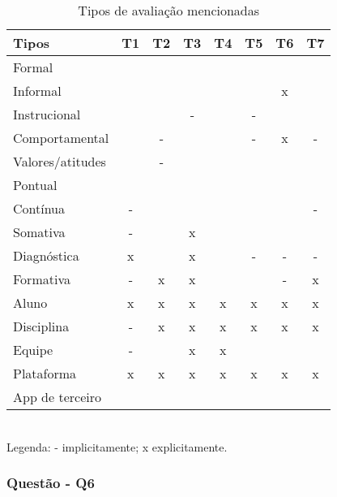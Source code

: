 \begin{table}[ht!]
\footnotesize
\caption{Tipos de avaliação mencionadas}
\label{tab:Q5}
\centering
\begin{tabular}{|l|c|c|c|c|c|c|c|}
\addlinespace \hline
    \bigstrut \textbf{Tipos}&{T1}&{T2}&{T3}&{T4}&{T5}&{T6}&{T7}\\
\hline
    \bigstrut[t]
    Formal	        & 	&   &   &   &   &   &   \\ \hline
    Informal	    &  	&   &   &   &   & x &   \\ \hline	
    Instrucional	& 	&   & - &   & - &   &   \\ \hline
    Comportamental	& 	& - &   &   & - & x & - \\ \hline
    Valores/atitudes& 	& - &   &   &   &   &   \\ \hline    
    Pontual	        & 	&   &   &   &   &   &   \\ \hline
    Contínua        & -	&   &   &   &   &   & - \\ \hline
    Somativa        & - &   & x &   &   &   &   \\ \hline    
    Diagnóstica     & x &   & x &   & - & - & - \\ \hline
    Formativa       & -	& x & x &   &   & - & x \\ \hline
    Aluno           & x	& x & x & x & x & x & x \\ \hline   
    Disciplina      & -	& x & x & x & x & x & x \\ \hline   
    Equipe          & -	&   & x & x &   &   &   \\ \hline
    Plataforma      & x	& x & x & x & x & x & x \\ \hline      
    \bigstrut[b]
    App de terceiro& 	&   &   &   &   &   &   \\
\hline
\end{tabular}
\\Legenda: - implicitamente; x explicitamente.
\end{table}

\subsubsection{Questão - Q6}%


